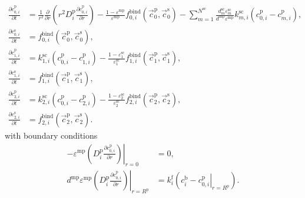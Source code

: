 \documentclass{article}
\begin{document}
\begin{align}
    \frac{\partial c^{\mathrm{p}}_{0,i}}{\partial t}
    &= \frac{1}{r^{2}} \frac{\partial }{\partial r} \left( r^{2} D^{\mathrm{p}}_{i} \frac{\partial c^{\mathrm{p}}_{0,i}}{\partial r} \right)
        - \frac{1 - \varepsilon^{\mathrm{mp}}}{\varepsilon^{\mathrm{mp}}}f^{\mathrm{bind}}_{0,i}\left( \vec{c}^{\mathrm{p}}_{0}, \vec{c}^{\mathrm{s}}_{0} \right)
        - \sum_{m=1}^{N^{\mathrm{sc}}} \frac{d^{\mathrm{sc}}_{m} \varepsilon^{\mathrm{sc}}_{m}}{d^{\mathrm{mp}} \varepsilon^{\mathrm{mp}}} k^{\mathrm{sc}}_{m,i} \left( c^{\mathrm{p}}_{0,i} - c^{\mathrm{p}}_{m,i} \right),
    \\
    \frac{\partial c^{\mathrm{s}}_{0,i}}{\partial t}
    &= f^{\mathrm{bind}}_{0,i}\left( \vec{c}^{\mathrm{p}}_{0}, \vec{c}^{\mathrm{s}}_{0} \right),
    \\
    \frac{\partial c^{\mathrm{p}}_{1,i}}{\partial t}
    &= k^{\mathrm{sc}}_{1,i} \left( c^{\mathrm{p}}_{0,i} - c^{\mathrm{p}}_{1,i} \right)
        - \frac{1 - \varepsilon^{\mathrm{sc}}_{1}}{\varepsilon^{\mathrm{sc}}_{1}} f^{\mathrm{bind}}_{1,i}\left( \vec{c}^{\mathrm{p}}_{1}, \vec{c}^{\mathrm{s}}_{1} \right),
    \\
    \frac{\partial c^{\mathrm{s}}_{1,i}}{\partial t}
    &= f^{\mathrm{bind}}_{1,i}\left( \vec{c}^{\mathrm{p}}_{1}, \vec{c}^{\mathrm{s}}_{1} \right),
    \\
    \frac{\partial c^{\mathrm{p}}_{2,i}}{\partial t}
    &= k^{\mathrm{sc}}_{2,i} \left( c^{\mathrm{p}}_{0,i} - c^{\mathrm{p}}_{2,i} \right)
        - \frac{1 - \varepsilon^{\mathrm{sc}}_{2}}{\varepsilon^{\mathrm{sc}}_{2}} f^{\mathrm{bind}}_{2,i}\left( \vec{c}^{\mathrm{p}}_{2}, \vec{c}^{\mathrm{s}}_{2} \right),
    \\
    \frac{\partial c^{\mathrm{s}}_{2,i}}{\partial t}
    &= f^{\mathrm{bind}}_{2,i}\left( \vec{c}^{\mathrm{p}}_{2}, \vec{c}^{\mathrm{s}}_{2} \right).
\end{align}
with boundary conditions
\begin{align}
    - \varepsilon^{\mathrm{mp}} \left. \left( D^{\mathrm{p}}_{i} \frac{\partial c^{\mathrm{p}}_{0,i}}{\partial r} \right) \right|_{r=0}
    &= 0,
    \\
    d^{\mathrm{mp}} \varepsilon^{\mathrm{mp}} \left. \left( D^{\mathrm{p}}_{i} \frac{\partial c^{\mathrm{p}}_{0,i}}{\partial r} \right) \right|_{r = R^{\mathrm{p}}}
    &= k^{\mathrm{f}}_{i} \left( c^{\mathrm{b}}_{i} - \left. c^{\mathrm{p}}_{0,i} \right|_{r = R^{\mathrm{p}}} \right).
\end{align}
\end{document}
